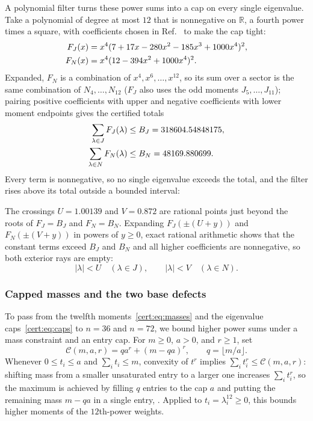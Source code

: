 A polynomial filter turns these power sums into a cap on every single
eigenvalue. Take a polynomial of degree at most $12$ that is nonnegative
on $\mathbb R$, a fourth power times a square, with coefficients chosen
in Ref.~\cite{OpenAI2026Periodic} to make the cap tight:
\begin{align}
 F_J(x)&=x^4(7+17x-280x^2-185x^3+1000x^4)^2,\notag \\
 F_N(x)&=x^4(12-394x^2+1000x^4)^2.
 \label{cert:eq:filters}
\end{align}
Expanded, $F_N$ is a combination of $x^4,x^6,\ldots,x^{12}$, so its sum
over a sector is the same combination of $N_4,\ldots,N_{12}$ ($F_J$ also
uses the odd moments $J_5,\ldots,J_{11}$); pairing positive coefficients
with upper and negative coefficients with lower moment endpoints gives
the certified totals
\begin{align}
 \sum_{\lambda\in J}F_J(\lambda)&\le B_J=318604.54848175,\notag \\
 \sum_{\lambda\in N}F_N(\lambda)&\le B_N=48169.880699.
 \label{cert:eq:filter-bounds}
\end{align}
Every term is nonnegative, so no single eigenvalue exceeds the total,
and the filter rises above its total outside a bounded interval:
\begin{proofdiagram}
 \filterfigure
\end{proofdiagram}
The crossings $U=1.00139$ and $V=0.872$ are rational points just beyond
the roots of $F_J=B_J$ and $F_N=B_N$. Expanding $F_J(\pm(U+y))$ and
$F_N(\pm(V+y))$ in powers of $y\ge0$, exact rational arithmetic shows
that the constant terms exceed $B_J$ and $B_N$ and all higher
coefficients are nonnegative, so both exterior rays are empty:
\begin{equation}
 |\lambda|<U\quad(\lambda\in J),\qquad
 |\lambda|<V\quad(\lambda\in N).
 \label{cert:eq:caps}
\end{equation}

\subsubsection{Capped masses and the two base defects}
\label{cert:sec:base-defects}

To pass from the twelfth moments~\eqref{cert:eq:masses} and the eigenvalue
caps~\eqref{cert:eq:caps} to $n=36$ and $n=72$, we bound higher power sums
under a mass constraint and an entry cap. For $m\ge0$, $a>0$, and $r\ge1$,
set
\begin{equation}
 \mathcal C(m,a,r)=qa^r+(m-qa)^r,\qquad
 q=\lfloor m/a\rfloor.
 \label{cert:eq:capped}
\end{equation}
Whenever $0\le t_i\le a$ and $\sum_i t_i\le m$, convexity of $t^r$
implies $\sum_i t_i^r\le\mathcal C(m,a,r)$: shifting mass from a smaller
unsaturated entry to a larger one increases $\sum_i t_i^r$, so the maximum
is achieved by filling $q$ entries to the cap $a$ and putting the
remaining mass $m-qa$ in a single entry, . Applied to
$t_i=\lambda_i^{12}\ge0$, this bounds higher moments of the $12$th-power
weights.

